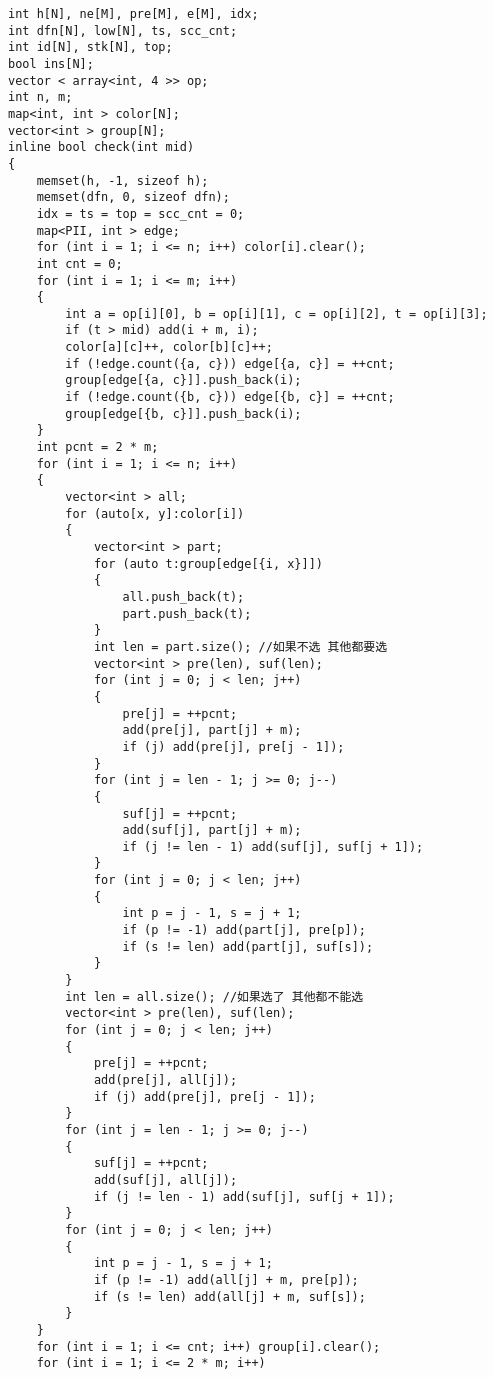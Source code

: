 \documentclass[a4paper, fontset=none]{ctexart}
\begin{document}
\begin{verbatim}
int h[N], ne[M], pre[M], e[M], idx;
int dfn[N], low[N], ts, scc_cnt;
int id[N], stk[N], top;
bool ins[N];
vector < array<int, 4 >> op;
int n, m;
map<int, int > color[N];
vector<int > group[N];
inline bool check(int mid)
{
    memset(h, -1, sizeof h);
    memset(dfn, 0, sizeof dfn);
    idx = ts = top = scc_cnt = 0;
    map<PII, int > edge;
    for (int i = 1; i <= n; i++) color[i].clear();
    int cnt = 0;
    for (int i = 1; i <= m; i++)
    {
        int a = op[i][0], b = op[i][1], c = op[i][2], t = op[i][3];
        if (t > mid) add(i + m, i);
        color[a][c]++, color[b][c]++;
        if (!edge.count({a, c})) edge[{a, c}] = ++cnt;
        group[edge[{a, c}]].push_back(i);
        if (!edge.count({b, c})) edge[{b, c}] = ++cnt;
        group[edge[{b, c}]].push_back(i);
    }
    int pcnt = 2 * m;
    for (int i = 1; i <= n; i++)
    {
        vector<int > all;
        for (auto[x, y]:color[i])
        {
            vector<int > part;
            for (auto t:group[edge[{i, x}]])
            {
                all.push_back(t);
                part.push_back(t);
            }
            int len = part.size(); //如果不选 其他都要选
            vector<int > pre(len), suf(len);
            for (int j = 0; j < len; j++)
            {
                pre[j] = ++pcnt;
                add(pre[j], part[j] + m);
                if (j) add(pre[j], pre[j - 1]);
            }
            for (int j = len - 1; j >= 0; j--)
            {
                suf[j] = ++pcnt;
                add(suf[j], part[j] + m);
                if (j != len - 1) add(suf[j], suf[j + 1]);
            }
            for (int j = 0; j < len; j++)
            {
                int p = j - 1, s = j + 1;
                if (p != -1) add(part[j], pre[p]);
                if (s != len) add(part[j], suf[s]);
            }
        }
        int len = all.size(); //如果选了 其他都不能选
        vector<int > pre(len), suf(len);
        for (int j = 0; j < len; j++)
        {
            pre[j] = ++pcnt;
            add(pre[j], all[j]);
            if (j) add(pre[j], pre[j - 1]);
        }
        for (int j = len - 1; j >= 0; j--)
        {
            suf[j] = ++pcnt;
            add(suf[j], all[j]);
            if (j != len - 1) add(suf[j], suf[j + 1]);
        }
        for (int j = 0; j < len; j++)
        {
            int p = j - 1, s = j + 1;
            if (p != -1) add(all[j] + m, pre[p]);
            if (s != len) add(all[j] + m, suf[s]);
        }
    }
    for (int i = 1; i <= cnt; i++) group[i].clear();
    for (int i = 1; i <= 2 * m; i++)

\end{verbatim}
\end{document}
